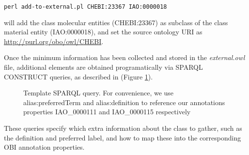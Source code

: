 \documentclass[a4paper,10pt,twocolumn]{article}
\begin{document}
\begin{footnotesize}
\begin{verbatim}
perl add-to-external.pl CHEBI:23367 IAO:0000018
\end{verbatim}
\end{footnotesize}

will add the class molecular entities (CHEBI:23367) as subclass of the class material entity (IAO:0000018), and set the source ontology URI as \url{http://purl.org/obo/owl/CHEBI}.

Once the minimum information has been collected  and stored in the \emph{external.owl} file, additional elements are obtained programatically via SPARQL\cite{RefWorks:1531} CONSTRUCT queries, as described in (Figure \ref{fig:sparql}).




\begin{figure}[t]
%  
\scriptsize
 
\caption{Template SPARQL query. For convenience, we use alias:preferredTerm and
alias:definition to reference our annotations properties IAO\_0000111 and IAO\_0000115 respectively}
\label{fig:sparql}
\end{figure}
These queries specify which extra information about the class to gather, such as the definition and preferred label, and how to map these into the corresponding OBI annotation properties. 
\end{document}
